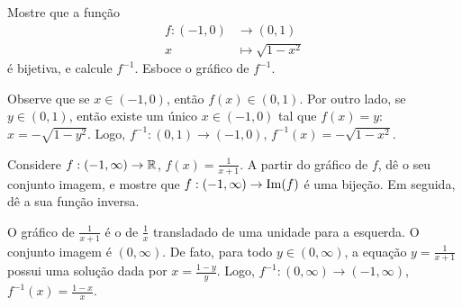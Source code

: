 \begin{exo}
Mostre que a função 
\begin{align*}
 f:(-1,0)&\to (0,1)\\
x&\mapsto \sqrt{1-x^2}
\end{align*}
é bijetiva, e calcule $f^{-1}$. Esboce o gráfico de $f^{-1}$.
\begin{sol}
Observe que se $x\in (-1,0)$, então $f(x)\in (0,1)$. Por outro lado, se $y\in (0,1)$,
então existe um único $x\in (-1,0)$ tal que $f(x)=y$: $x=-\sqrt{1-y^2}$.
Logo, $f^{-1}:(0,1)\to(-1,0)$, $f^{-1}(x)=-\sqrt{1-x^2}$.
\begin{center}
\begin{bmlimage}\end{bmlimage}
\end{center}
\end{sol}
\end{exo}

\begin{exo}
Considere $f:(-1,\infty)\to \mathbb{R}$, $f(x)=\frac{1}{x+1}$. A partir do gráfico de $f$, dê o
seu conjunto imagem, e mostre que $f:(-1,\infty)\to \operatorname{Im}(f)$ 
é uma bijeção. Em seguida, dê a sua função inversa.
\begin{sol}
O gráfico de $\frac{1}{x+1}$ é o de $\tfrac1x$ transladado de uma unidade para a esquerda.
O conjunto imagem é $(0,\infty)$. De fato, para todo $y\in (0,\infty)$, a equação $y=\frac{1}{x+1}$
possui uma solução dada por $x=\frac{1-y}{y}$. Logo, $f^{-1}:(0,\infty)\to (-1,\infty)$,
$f^{-1}(x)=\frac{1-x}{x}$.
\end{sol}
\end{exo}

